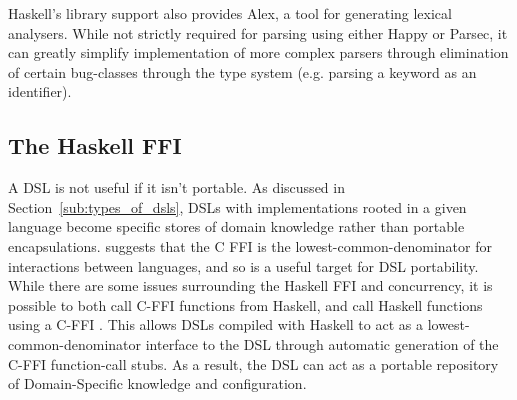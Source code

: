 Haskell's library support also provides Alex, a tool for generating lexical analysers. 
While not strictly required for parsing using either Happy or Parsec, it can greatly simplify implementation of more complex parsers through elimination of certain bug-classes through the type system (e.g. parsing a keyword as an identifier).


\subsection{The Haskell FFI} %
\label{sub:the_haskell_ffi}

A DSL is not useful if it isn't portable.
As discussed in Section~\ref{sub:types_of_dsls}, DSLs with implementations rooted in a given language become specific stores of domain knowledge rather than portable encapsulations.
\citet{Marlow:2004:EHF:1017472.1017479} suggests that the C FFI is the lowest-common-denominator for interactions between languages, and so is a useful target for DSL portability.\\

While there are some issues surrounding the Haskell FFI and concurrency, it is possible to both call C-FFI functions from Haskell, and call Haskell functions using a C-FFI \citep{Marlow:2004:EHF:1017472.1017479,HaskellWikiFFIFromC}.
This allows DSLs compiled with Haskell to act as a lowest-common-denominator interface to the DSL through automatic generation of the C-FFI function-call stubs. 
As a result, the DSL can act as a portable repository of Domain-Specific knowledge and configuration. 


